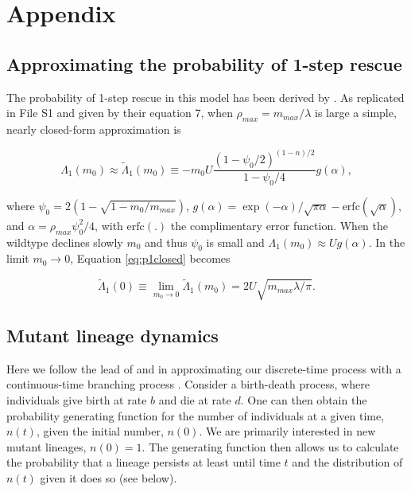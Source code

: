 \documentclass[9pt,twocolumn,twoside,lineno]{gsajnl}
\begin{document}
\section{Appendix}
\label{sec:appendix}

\subsection{Approximating the probability of 1-step rescue}
\label{subsec:1stepApproximations}

The probability of 1-step rescue in this model has been derived by \cite{Anciaux2018}.
As replicated in File S1 and given by their equation 7, when $\rho_{max} = m_{max}/\lambda$ is large a simple, nearly closed-form approximation is

\begin{equation}\label{eq:p1closed}
\Lambda_1(m_0) \approx \tilde{\Lambda}_1(m_0) \equiv  -m_0 U \frac{(1-\psi_0/2)^{(1-n)/2}}{1-\psi_0/4} g(\alpha),
\end{equation}

\noindent where $\psi_0 = 2(1-\sqrt{1-m_0/m_{max}})$, $g(\alpha) = \exp(-\alpha)/\sqrt{\pi \alpha} - \mathrm{erfc}(\sqrt{\alpha})$, and $\alpha=\rho_{max} \psi_0^2/4$, with $\mathrm{erfc}(.)$ the complimentary error function.
When the wildtype declines slowly $m_0$ and thus $\psi_0$ is small and $\Lambda_1(m_0)\approx U g(\alpha)$.
In the limit $m_0\rightarrow0$, Equation \ref{eq:p1closed} becomes

\begin{equation}\label{eq:Lambda0}
\tilde{\Lambda}_1(0) \equiv \lim_{m_0\rightarrow0} \tilde{\Lambda}_1(m_0) = 2 U \sqrt{m_{max}\lambda/\pi}.
\end{equation} 

\subsection{Mutant lineage dynamics}
\label{subsec:mutants}

Here we follow the lead of \cite{Weissman2010} and \cite{Uecker2016} in approximating our discrete-time process with a continuous-time branching process \citep[see chapter 6 in][]{Allen2010}. 
Consider a birth-death process, where individuals give birth at rate $b$ and die at rate $d$. 
One can then obtain the probability generating function for the number of individuals at a given time, $n(t)$, given the initial number, $n(0)$.
We are primarily interested in new mutant lineages, $n(0)=1$.
The generating function then allows us to calculate the probability that a lineage persists at least until time $t$ and the distribution of $n(t)$ given it does so (see below).
\end{document}
